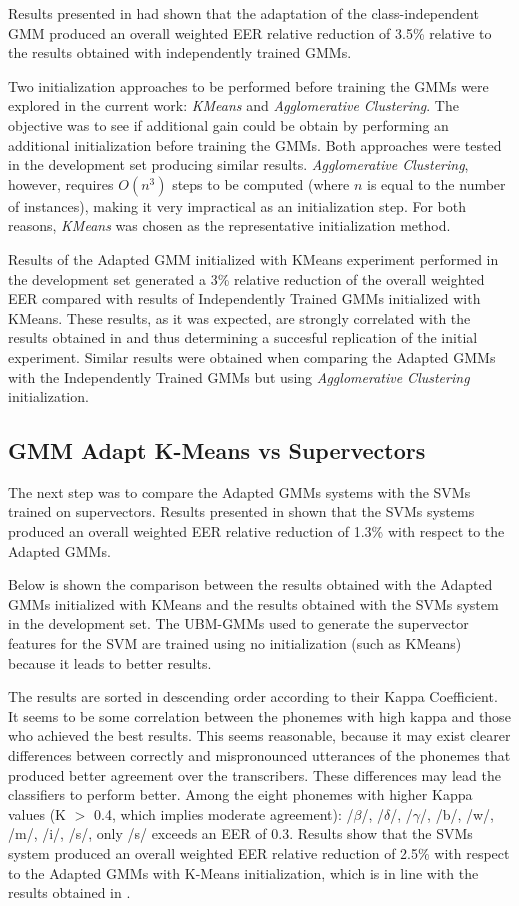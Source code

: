 Results presented in \cite{main} had shown that the adaptation of the class-independent GMM produced
an overall weighted EER relative reduction of 3.5\% relative to the results
obtained with independently trained GMMs.

Two initialization approaches to be performed before training the GMMs
were explored in the current work: \textit{KMeans} and \textit{Agglomerative Clustering}. The
objective was to see if additional gain could be obtain by performing an additional initialization
before training the GMMs. Both approaches were tested in the development set producing similar
results. \textit{Agglomerative Clustering}, however, requires $O(n^{3})$ steps to be computed
(where $n$ is equal to the number of instances), making it very impractical as an initialization
step. For both reasons, \textit{KMeans} was chosen as the representative initialization method.

Results of the Adapted GMM initialized with KMeans experiment performed in the development set
generated a 3\% relative reduction of the overall weighted EER compared with results of
Independently Trained GMMs initialized with KMeans.
These results, as it was
expected, are strongly correlated with the results obtained in \cite{main} and
thus determining a succesful replication of the initial experiment. Similar results were obtained
when comparing the Adapted GMMs with the Independently Trained GMMs but using
\textit{Agglomerative Clustering} initialization.

\subsection{GMM Adapt K-Means vs Supervectors}

The next step was to compare the Adapted GMMs systems with the SVMs trained on supervectors.
Results presented in \cite{main} shown that the SVMs systems produced an overall weighted EER
relative reduction of 1.3\% with respect to the Adapted GMMs.

Below is shown the comparison between the results obtained with the Adapted GMMs initialized
with KMeans and the results obtained with the SVMs system in the development set.
The UBM-GMMs used to generate the
supervector features for the SVM are trained using no initialization (such as KMeans) because
it leads to better results.

The results are sorted in descending order according to their Kappa Coefficient.
It seems to be some correlation between the phonemes with high kappa and those who achieved
the best results. This seems reasonable, because it may exist clearer differences
between correctly and mispronounced
utterances of the phonemes that produced better agreement over the transcribers.
These differences may lead the classifiers to perform better.
Among the eight phonemes with higher Kappa values (K $>$ 0.4, which implies moderate agreement):
/$\beta$/, /$\delta$/, /$\gamma$/, /b/, /w/, /m/, /i/, /s/, only /s/ exceeds an EER of 0.3.
Results show that the SVMs system produced an overall weighted EER relative reduction of 2.5\% with
respect to the Adapted GMMs with K-Means initialization, which is in line with the results obtained
in \cite{main}.

